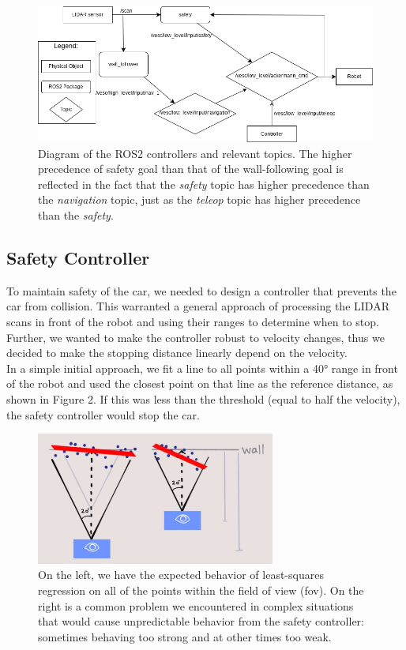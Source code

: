 \documentclass{article}
\begin{document}
\begin{figure}[!h]
    \centering
    \includegraphics[width=\linewidth]{lab3diagram.drawio.png}
    \caption{Diagram of the ROS2 controllers and relevant topics. The higher precedence of safety goal than that of the wall-following goal is reflected in the fact that the \textit{safety} topic has higher precedence than the \textit{navigation} topic, just as the \textit{teleop} topic has higher precedence than the \textit{safety}.}
    \label{fig:enter-label}
\end{figure}


\subsection{Safety Controller}
To maintain safety of the car, we needed to design a controller that prevents the car from collision. This warranted a general approach of processing the LIDAR scans in front of the robot and using their ranges to determine when to stop. Further, we wanted to make the controller robust to velocity changes, thus we decided to make the stopping distance linearly depend on the velocity.\\

In a simple initial approach, we fit a line to all points within a 40° range in front of the robot and used the closest point on that line as the reference distance, as shown in Figure 2. If this was less than the threshold (equal to half the velocity), the safety controller would stop the car. \\
\begin{figure}[!h]
\begin{center}
\includegraphics[width=0.7\textwidth]{safety_all.png}
\caption{On the left, we have the expected behavior of least-squares regression on all of the points within the field of view (fov). On the right is a common problem we encountered in complex situations that would cause unpredictable behavior from the safety controller: sometimes behaving too strong and at other times too weak.}
\end{center}
\end{figure}
\end{document}
